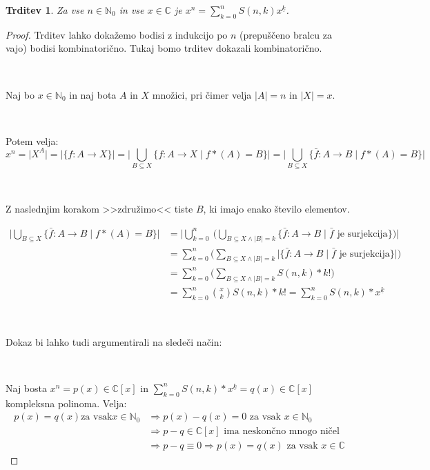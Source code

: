 \documentclass[a4paper, 10pt]{article}
\newtheorem{trditev}{Trditev}
\newcommand{\abs}[1]{\ensuremath{\lvert #1 \rvert}}
\newcommand{\mth}[1]{\ensuremath{\mathbb{#1}}}
\newcommand{\No}{\mth{N}_0}
\newcommand{\C}{\mth{C}}
\newcommand{\padex}[2]{\ensuremath{{#1}^{\underline{#2}}}}
\newcommand{\map}[3]{\ensuremath{{#1}: {#2} \rightarrow {#3}}}
\newcommand{\pra}[3]{{#1}{\ast}({#2}) = {#3}}
\begin{document}
\begin{trditev}
	Za vse $n \in \No$ in vse $x \in \C$ je $x^n = \sum_{k = 0}^{n}{S(n, k) \padex{x}{k}}$.
\end{trditev}

\begin{proof}
	Trditev lahko dokažemo bodisi z indukcijo po $n$ (prepuščeno bralcu za vajo) bodisi kombinatorično. Tukaj bomo trditev dokazali kombinatorično.
	
	~
	
	Naj bo $x\in\No$ in naj bota $A$ in $X$ množici, pri čimer velja $\abs{A} = n$ in $\abs{X} = x$.
	
	~
	
	Potem velja:
	\[ x^n = \abs{X^A} = \abs{\{\map{f}{A}{X}\}} = \abs{\bigcup_{B \subseteq X} \{ \map{f}{A}{X} \mid \pra{f}{A}{B}\}} = \abs{\bigcup_{B \subseteq X} \{ \map{\bar{f}}{A}{B} \mid \pra{f}{A}{B}\}}\]
	
	~
	
	Z naslednjim korakom >>združimo<< tiste $B$, ki imajo enako število elementov.
	
	\begin{align*}
	 \abs{\bigcup_{B \subseteq X} \{ \map{\bar{f}}{A}{B} \mid \pra{f}{A}{B}\}} & = \abs{\bigcup_{k = 0}^{n}~\Bigg( \bigcup_{B \subseteq X \land \abs{B} = k} \{ \map{\bar{f}}{A}{B} \mid \bar{f}\text{~je surjekcija}\}\Bigg)} \\
	 & = \sum_{k = 0}^{n}\Bigg(\sum_{B \subseteq X \land \abs{B} = k} \abs{\{ \map{\bar{f}}{A}{B} \mid \bar{f}\text{~je surjekcija}\}} \Bigg) \\
	 & = \sum_{k = 0}^{n}\Bigg(\sum_{B \subseteq X \land \abs{B} = k} S(n, k) * k! \Bigg) \\
	 & = \sum_{k = 0}^{n} \binom{x}{k}S(n, k) * k! = \sum_{k = 0}^{n} S(n, k) * \padex{x}{k}
	\end{align*}
	
	~
	
	Dokaz bi lahko tudi argumentirali na sledeči način:
	
	~
	
	Naj bosta $x^n = p(x) \in\C[x]$ in $\sum_{k = 0}^{n} S(n, k) * \padex{x}{k} = q(x) \in\C[x]$ kompleksna polinoma. Velja:
	\begin{align*}
	p(x) = q(x) \text{za vsak} x \in \No & \Rightarrow p(x) - q(x) = 0 \text{~za vsak~} x\in\No \\
	& \Rightarrow p - q \in \C[x] \text{~ima neskončno mnogo ničel~} \\
	& \Rightarrow p - q \equiv 0 \Rightarrow p(x) = q(x) \text{~za vsak~} x\in\C
	\end{align*}
	
\end{proof}
	 
\end{document}

